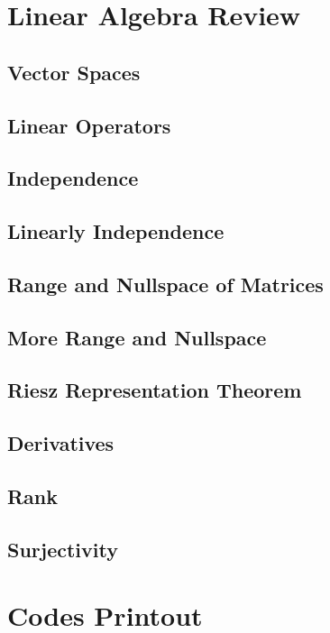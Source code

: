 \documentclass[11pt,a4paper]{report}
\begin{document}
\chapter{Linear Algebra Review}
\section{Vector Spaces}

\section{Linear Operators}

\section{Independence}

\section{Linearly Independence}

\section{Range and Nullspace of Matrices}

\section{More Range and Nullspace}

\section{Riesz Representation Theorem}

\section{Derivatives}

\section{Rank}



\section{Surjectivity}

\newpage
\appendix
\chapter{Codes Printout}
\end{document}

